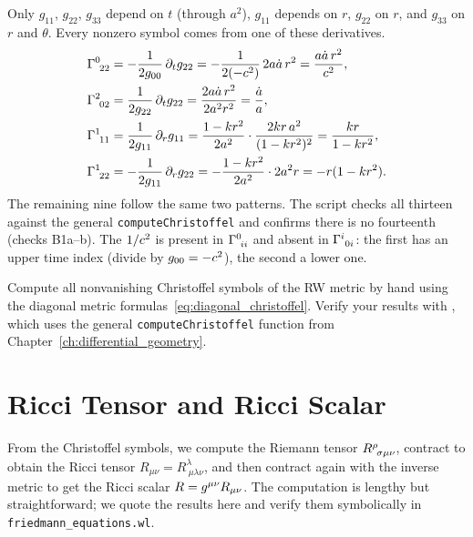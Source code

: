 \begin{derivation}
Only $g_{11}$, $g_{22}$, $g_{33}$ depend on $t$ (through $a^2$), $g_{11}$ depends
on $r$, $g_{22}$ on $r$, and $g_{33}$ on $r$ and $\theta$.  Every nonzero symbol
comes from one of these derivatives.
\begin{align*}
  \Gamma^{0}_{\ 2 2} &= -\frac{1}{2g_{00}}\,\partial_t g_{22}
    = -\frac{1}{2(-c^2)}\,2a\dot a\,r^2
    = \frac{a\dot a\,r^2}{c^2},\\
  \Gamma^{2}_{\ 0 2} &= \frac{1}{2g_{22}}\,\partial_t g_{22}
    = \frac{2a\dot a\,r^2}{2a^2r^2} = \frac{\dot a}{a},\\
  \Gamma^{1}_{\ 1 1} &= \frac{1}{2g_{11}}\,\partial_r g_{11}
    = \frac{1-kr^2}{2a^2}\cdot\frac{2kr\,a^2}{(1-kr^2)^2} = \frac{kr}{1-kr^2},\\
  \Gamma^{1}_{\ 2 2} &= -\frac{1}{2g_{11}}\,\partial_r g_{22}
    = -\frac{1-kr^2}{2a^2}\cdot 2a^2 r = -r(1-kr^2).
\end{align*}
The remaining nine follow the same two patterns.  The script checks all
thirteen against the general \texttt{computeChristoffel} and confirms there is
no fourteenth (checks B1a--b).  The $1/c^2$ is present in
$\Gamma^{0}_{\ i i}$ and absent in $\Gamma^{i}_{\ 0 i}$: the first
has an upper time index (divide by $g_{00} = -c^2$), the second a
lower one.
\end{derivation}
\begin{exercise}
\label{ex:frw_christoffel}
Compute all nonvanishing Christoffel symbols of the RW metric by hand
using the diagonal metric formulas~\eqref{eq:diagonal_christoffel}.
Verify your results with
,
which uses the general \texttt{computeChristoffel} function from
Chapter~\ref{ch:differential_geometry}.
\end{exercise}


\section{Ricci Tensor and Ricci Scalar}
\label{sec:frw_ricci}

From the Christoffel symbols, we compute the Riemann tensor
$R^{\rho}_{\ \sigma \mu \nu}$, contract to obtain the Ricci tensor
$R_{\mu\nu} = R^\lambda_{\ \mu\lambda\nu}$, and then contract again
with the inverse metric to get the Ricci scalar $R = g^{\mu\nu}
R_{\mu\nu}$.  The computation is lengthy but straightforward; we quote
the results here and verify them symbolically in
\texttt{friedmann\_equations.wl}.

